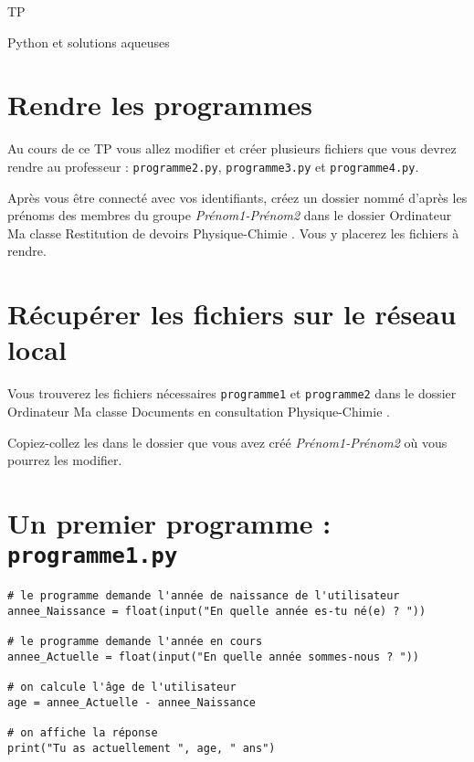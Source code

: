 





\begin{header}
TP

Python\texttrademark{} et solutions aqueuses
\end{header}

\section*{Rendre les programmes}

Au cours de ce TP vous allez modifier et créer plusieurs fichiers que vous devrez rendre au professeur : \texttt{programme2.py}, \texttt{programme3.py} et \texttt{programme4.py}.

Après vous être connecté avec vos identifiants, créez un dossier nommé d'après les prénoms des membres du groupe \textit{Prénom1-Prénom2} dans le dossier \og Ordinateur \textrightarrow{} Ma classe \textrightarrow{} Restitution de devoirs \textrightarrow{} Physique-Chimie \fg{}.
Vous y placerez les fichiers à rendre.

\section*{Récupérer les fichiers sur le réseau local}

Vous trouverez les fichiers nécessaires \texttt{programme1} et \texttt{programme2} dans le dossier \og Ordinateur \textrightarrow{} Ma classe \textrightarrow{} Documents en consultation \textrightarrow{} Physique-Chimie \fg{}.

Copiez-collez les dans le dossier que vous avez créé \textit{Prénom1-Prénom2} où vous pourrez les modifier.

\section*{Un premier programme : \texttt{programme1.py}}

\begin{lstlisting}[style = Python]
# le programme demande l'année de naissance de l'utilisateur
annee_Naissance = float(input("En quelle année es-tu né(e) ? "))

# le programme demande l'année en cours
annee_Actuelle = float(input("En quelle année sommes-nous ? "))

# on calcule l'âge de l'utilisateur
age = annee_Actuelle - annee_Naissance

# on affiche la réponse
print("Tu as actuellement ", age, " ans")
\end{lstlisting}

